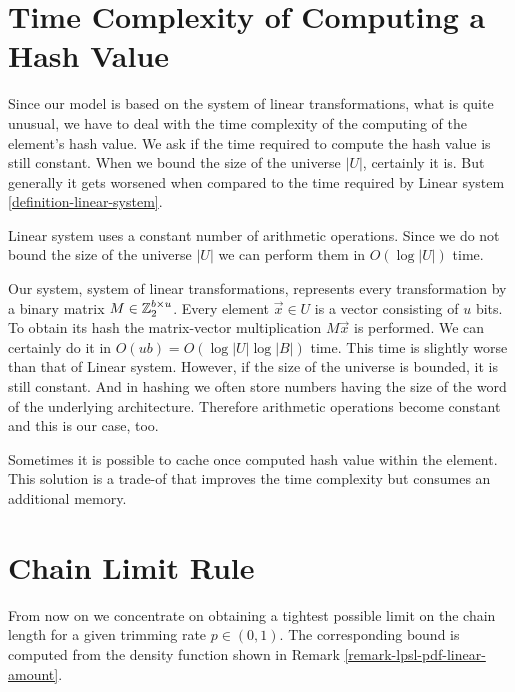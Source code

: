 \section{Time Complexity of Computing a Hash Value}
Since our model is based on the system of linear transformations, what is quite unusual, we have to deal with the time complexity of the computing of the element's hash value. We ask if the time required to compute the hash value is still constant. When we bound the size of the universe $|U|$, certainly it is. But generally it gets worsened when compared to the time required by Linear system \ref{definition-linear-system}. 

Linear system uses a constant number of arithmetic operations. Since we do not bound the size of the universe $|U|$ we can perform them in $O(\log |U|)$ time. 

Our system, system of linear transformations, represents every transformation by a binary matrix $M \in \mathbb{Z}_{2}^{b \times u}$. Every element $\vec{x} \in U$ is a vector consisting of $u$ bits. To obtain its hash the matrix-vector multiplication $M\vec{x}$ is performed. We can certainly do it in $O(u b) = O(\log |U| \log |B|)$ time. This time is slightly worse than that of Linear system. However, if the size of the universe is bounded, it is still constant. And in hashing we often store numbers having the size of the word of the underlying architecture. Therefore arithmetic operations become constant and this is our case, too.

Sometimes it is possible to cache once computed hash value within the element. This solution is a trade-of that improves the time complexity but consumes an additional memory.

\section{Chain Limit Rule}
\label{section-linear-systems-linear-amount-constant-estimate}
From now on we concentrate on obtaining a tightest possible limit on the chain length for a given trimming rate $p \in (0, 1)$. The corresponding bound is computed from the density function shown in Remark \ref{remark-lpsl-pdf-linear-amount}. 

